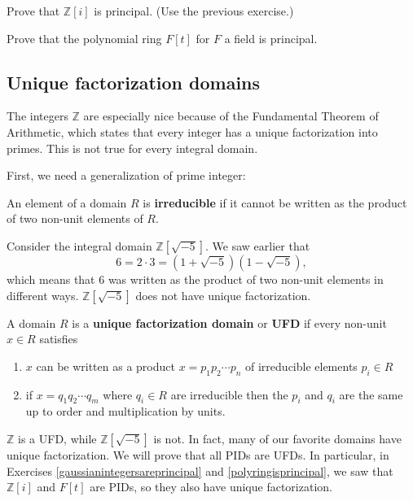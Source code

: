 \begin{exercise} \label{gaussianintegersareprincipal}
Prove that $\mathbb{Z}[i]$ is principal. (Use the previous exercise.)
\end{exercise} 

\begin{exercise} \label{polyringisprincipal}
Prove that the polynomial ring $F[t]$ for $F$ a field is principal. 
\end{exercise} 

\subsection{Unique factorization domains}

The integers $\mathbb{Z}$ are especially nice because of the Fundamental
Theorem of Arithmetic, which states that every integer has a unique
factorization into primes. This is not true for every integral domain.

First, we need a generalization of prime integer:
\begin{definition} 
An element of a domain $R$ is \textbf{irreducible} if it cannot be written
as the product of two non-unit elements of $R$.
\end{definition} 

\begin{example} 
Consider the integral domain $\mathbb{Z}[\sqrt{-5}]$. We saw earlier that 
\[ 
6 = 2 \cdot 3 = (1 + \sqrt{-5})(1 - \sqrt{-5}),
\] 
which means that $6$ was written as the product of two non-unit elements in
different ways. $\mathbb{Z}[\sqrt{-5}]$ does not have unique factorization.
\end{example} 

\begin{definition} 
A domain $R$ is a \textbf{unique factorization domain} or \textbf{UFD} if every
non-unit $x \in R$ satisfies
\begin{enumerate}
\item $x$ can be written as a product $x = p_1 p_2 \cdots p_n$ of 
irreducible elements $p_i \in R$
\item if $x = q_1 q_2 \cdots q_m$ where $q_i \in R$ are irreducible
then the $p_i$ and $q_i$ are the same up to order and multiplication by units.
\end{enumerate}
\end{definition} 

\begin{example}
$\mathbb{Z}$ is a UFD, while $\mathbb{Z}[\sqrt{-5}]$ is not. In fact, many of
our favorite domains have unique factorization. We will prove that all PIDs 
are UFDs. In particular, in Exercises \ref{gaussianintegersareprincipal} and
\ref{polyringisprincipal}, we saw that $\mathbb{Z}[i]$ and $F[t]$ are PIDs,
so they also have unique factorization.
\end{example}

